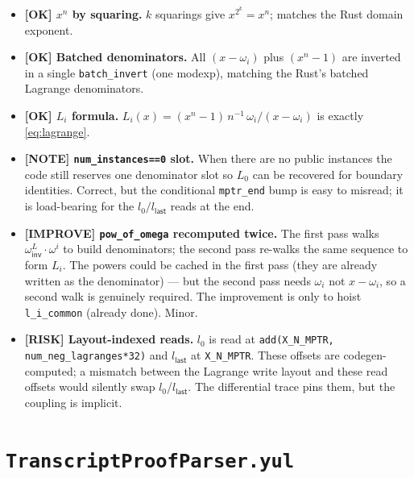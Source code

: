 \begin{itemize}
  \item \textcolor{tracegreen}{\textbf{[OK] $x^n$ by squaring.}} $k$
        squarings give $x^{2^k}=x^n$; matches the Rust domain exponent.
  \item \textcolor{tracegreen}{\textbf{[OK] Batched denominators.}} All
        $(x-\omega_i)$ plus $(x^n-1)$ are inverted in a single
        \texttt{batch\_invert} (one modexp), matching the Rust's batched
        Lagrange denominators.
  \item \textcolor{tracegreen}{\textbf{[OK] $L_i$ formula.}}
        $L_i(x)=(x^n-1)\,n^{-1}\,\omega_i/(x-\omega_i)$ is exactly
        \eqref{eq:lagrange}.
  \item \textcolor{mathpurple}{\textbf{[NOTE] \texttt{num\_instances==0}
        slot.}} When there are no public instances the code still reserves
        one denominator slot so $L_0$ can be recovered for boundary
        identities. Correct, but the conditional \texttt{mptr\_end} bump
        is easy to misread; it is load-bearing for the
        $l_0/l_{\mathsf{last}}$ reads at the end.
  \item \textcolor{codegenblue}{\textbf{[IMPROVE] \texttt{pow\_of\_omega}
        recomputed twice.}} The first pass walks
        $\omega_{\mathsf{inv}}^L \cdot \omega^i$ to build denominators;
        the second pass re-walks the same sequence to form $L_i$. The
        powers could be cached in the first pass (they are already
        written as the denominator) --- but the second pass needs
        $\omega_i$ not $x-\omega_i$, so a second walk is genuinely
        required. The improvement is only to hoist
        \texttt{l\_i\_common} (already done). Minor.
  \item \textcolor{rustorange}{\textbf{[RISK] Layout-indexed reads.}}
        $l_0$ is read at
        \texttt{add(X\_\allowbreak{}N\_\allowbreak{}MPTR, num\_\allowbreak{}neg\_\allowbreak{}lagranges*32)} and
        $l_{\mathsf{last}}$ at \texttt{X\_N\_MPTR}. These offsets are
        codegen-computed; a mismatch between the Lagrange write layout and
        these read offsets would silently swap $l_0$/$l_{\mathsf{last}}$.
        The differential trace pins them, but the coupling is implicit.
\end{itemize}

\section{\texttt{TranscriptProofParser.yul}}
\label{sec:parser-audit}

